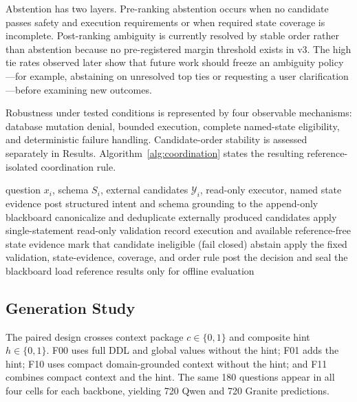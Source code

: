 \documentclass[applsci,article,submit,moreauthors]{Definitions/mdpi}
\begin{document}
Abstention has two layers. Pre-ranking abstention occurs when no candidate passes safety and execution requirements or when required state coverage is incomplete. Post-ranking ambiguity is currently resolved by stable order rather than abstention because no pre-registered margin threshold exists in v3. The high tie rates observed later show that future work should freeze an ambiguity policy---for example, abstaining on unresolved top ties or requesting a user clarification---before examining new outcomes.

Robustness under tested conditions is represented by four observable mechanisms: database mutation denial, bounded execution, complete named-state eligibility, and deterministic failure handling. Candidate-order stability is assessed separately in Results. Algorithm~\ref{alg:coordination} states the resulting reference-isolated coordination rule.

\begin{algorithm}[htbp]
\caption{Reference-isolated deterministic coordination}
\label{alg:coordination}
\begin{algorithmic}[1]
\REQUIRE question $x_i$, schema $S_i$, external candidates $\mathcal{Y}_i$, read-only executor, named state evidence
\STATE post structured intent and schema grounding to the append-only blackboard
\STATE canonicalize and deduplicate externally produced candidates
  \STATE apply single-statement read-only validation
  \STATE record execution and available reference-free state evidence
\ENDFOR
{}
  \STATE mark that candidate ineligible (fail closed)
\ENDIF
{}
  \STATE abstain
\ELSE
  \STATE apply the fixed validation, state-evidence, coverage, and order rule
\ENDIF
\STATE post the decision and seal the blackboard
\STATE load reference results only for offline evaluation
\end{algorithmic}
\end{algorithm}

\subsection{Generation Study}

The paired design crosses context package $c\in\{0,1\}$ and composite hint $h\in\{0,1\}$. F00 uses full DDL and global values without the hint; F01 adds the hint; F10 uses compact domain-grounded context without the hint; and F11 combines compact context and the hint. The same 180 questions appear in all four cells for each backbone, yielding 720 Qwen and 720 Granite predictions.
\end{document}
